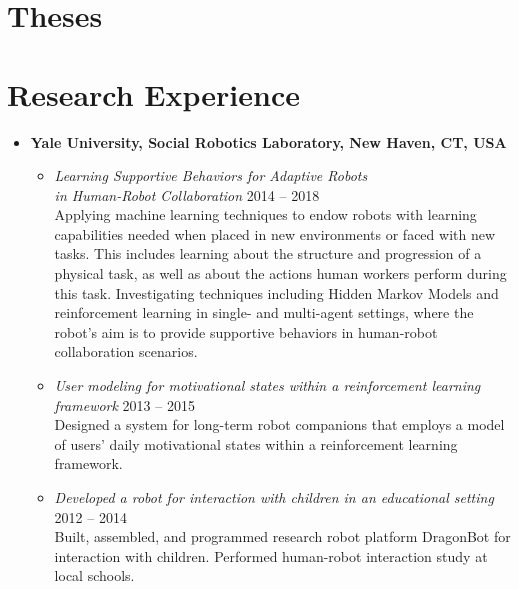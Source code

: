 \documentclass[10pt,letterpaper]{article}
\newcommand{\thing}[2]{{#1} \hfill {#2}}
\begin{document}
\section{Theses}
\printbibliography[heading=none,keyword=phd_thesis,omitnumbers=true,prefixnumbers={Ph.D. Thesis}]
\printbibliography[heading=none,keyword=ma_thesis,omitnumbers=true,prefixnumbers={Master's Thesis}]

\section{Research Experience}
\begin{itemize}%
\item {\bf Yale University, Social Robotics Laboratory, New Haven, CT, USA}\\
	\begin{itemize}\setlength\itemsep{0.8em}\vspace{-1em}
	\item \thing{\it Learning Supportive Behaviors for Adaptive Robots \\ in Human-Robot Collaboration}{2014 -- 2018}\vspace{0.1em}\\
	Applying machine learning techniques to endow robots with learning capabilities needed when placed in new environments or faced with new tasks. This includes learning about the structure and progression of a physical task, as well as about the actions human workers perform during this task. Investigating techniques including Hidden Markov Models and reinforcement learning in single- and multi-agent settings, where the robot's aim is to provide supportive behaviors in human-robot collaboration scenarios.
	\item \thing{\it User modeling for motivational states within a reinforcement learning framework}{2013 -- 2015}\vspace{0.1em}\\
	Designed a system for long-term robot companions that employs a model of users' daily motivational states within a reinforcement learning framework.
	\item \thing{\it Developed a robot for interaction with children in an educational setting}{2012 -- 2014}\vspace{0.1em}\\
	 Built, assembled, and programmed research robot platform DragonBot for interaction with children. Performed human-robot interaction study at local schools.
	\end{itemize}

\end{itemize}
\end{document}
